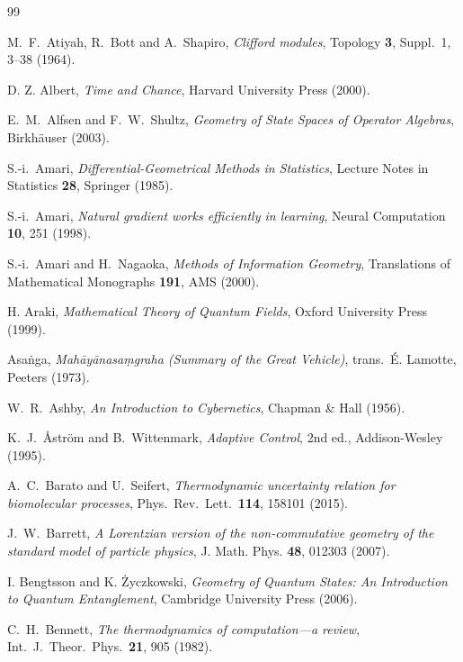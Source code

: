 \documentclass[12pt,a4paper,openany]{book}
\begin{document}
\begin{thebibliography}{99}

M.~F.~Atiyah, R.~Bott and A.~Shapiro,
\emph{Clifford modules},
Topology \textbf{3}, Suppl.~1, 3--38 (1964).

D. Z. Albert, \emph{Time and Chance}, Harvard University Press (2000).

E.~M.~Alfsen and F.~W.~Shultz, \emph{Geometry of State Spaces of Operator Algebras}, Birkh\"auser (2003).

S.-i.~Amari,
\emph{Differential-Geometrical Methods in Statistics},
Lecture Notes in Statistics \textbf{28}, Springer (1985).

S.-i.~Amari,
\emph{Natural gradient works efficiently in learning},
Neural Computation \textbf{10}, 251 (1998).

S.-i.~Amari and H.~Nagaoka,
\emph{Methods of Information Geometry},
Translations of Mathematical Monographs \textbf{191},
AMS (2000).

H. Araki, \emph{Mathematical Theory of Quantum Fields}, Oxford University Press (1999).

Asaṅga, \emph{Mahāyānasaṃgraha (Summary of the Great Vehicle)}, trans.\ É. Lamotte, Peeters (1973).

W.~R.~Ashby,
\emph{An Introduction to Cybernetics},
Chapman \& Hall (1956).

K.~J.~\AA{}str\"{o}m and B.~Wittenmark,
\emph{Adaptive Control},
2nd ed., Addison-Wesley (1995).

A.~C.~Barato and U.~Seifert,
\emph{Thermodynamic uncertainty relation for biomolecular
processes},
Phys.\ Rev.\ Lett.\ \textbf{114}, 158101 (2015).

J.~W.~Barrett, \emph{A Lorentzian version of the non-commutative geometry of the standard model of particle physics}, J. Math. Phys. \textbf{48}, 012303 (2007).

I. Bengtsson and K. \.Zyczkowski, \emph{Geometry of Quantum States: An Introduction to Quantum Entanglement}, Cambridge University Press (2006).

C.~H.~Bennett,
\emph{The thermodynamics of computation---a review},
Int.\ J.\ Theor.\ Phys.\ \textbf{21}, 905 (1982).


\end{thebibliography}
\end{document}
